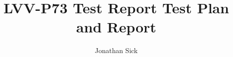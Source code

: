 \documentclass[DM,lsstdraft,toc]{lsstdoc}
\begin{document}
\def\milestoneName{Test Report}
\def\milestoneId{LVV-P73}
\def\product{Data Management}


\title{LVV-P73 Test Report Test Plan and Report}
\setDocRef{\lsstDocType-\lsstDocNum}
\date{\vcsdate}
\author{Jonathan Sick}




\end{document}
